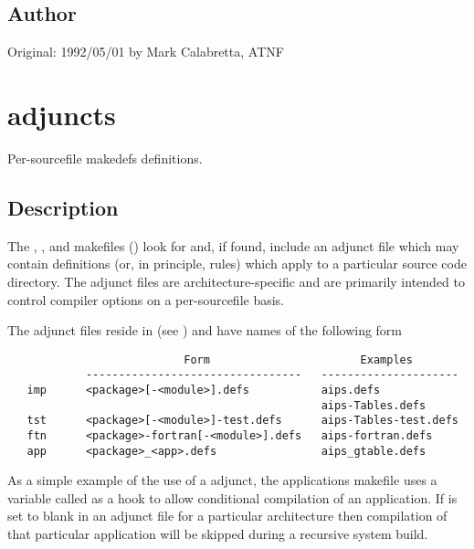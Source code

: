 \subsection*{Author}

Original: 1992/05/01 by Mark Calabretta, ATNF


\newpage
\section{ adjuncts}
\label{makedefs adjuncts}


 
Per-sourcefile makedefs definitions.
 
\subsection*{Description}

The , ,  and  makefiles
() look for and, if found, include an adjunct 
file which may contain definitions (or, in principle, rules) which apply to a
particular source code directory.  The adjunct files are architecture-specific
and are primarily intended to control compiler options on a per-sourcefile
basis.

The adjunct files reside in  (see ) and have
names of the following form

\begin{verbatim}
                           Form                       Examples
            ---------------------------------   ---------------------
   imp      <package>[-<module>].defs           aips.defs
                                                aips-Tables.defs
   tst      <package>[-<module>]-test.defs      aips-Tables-test.defs
   ftn      <package>-fortran[-<module>].defs   aips-fortran.defs
   app      <package>_<app>.defs                aips_gtable.defs
\end{verbatim}

\noindent
As a simple example of the use of a  adjunct, the applications
makefile uses a variable called  as a hook to allow conditional
compilation of an application.  If  is set to blank in an adjunct
file for a particular architecture then compilation of that particular
application will be skipped during a recursive system build.

